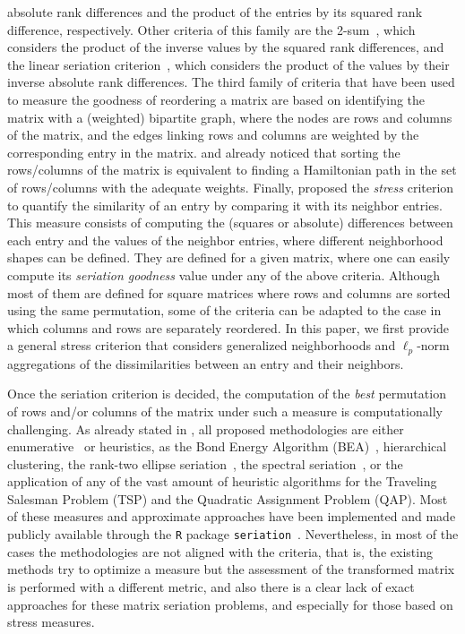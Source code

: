 \documentclass[a4paper,11pt, reqno]{amsart}
\begin{document}
absolute rank differences and the product of the entries by its squared rank difference, respectively. Other criteria of this family are the 2-sum~\citep{barnard1993spectral}, which considers the product of the inverse values by the squared rank differences, and the linear seriation criterion~\cite{hubert1976quadratic}, which considers the product of the values by their inverse absolute rank differences. The third family of criteria that have been used to measure the goodness of reordering a matrix are based on identifying the matrix with a (weighted) bipartite graph, where the nodes are rows and columns of the matrix, and the edges linking rows and columns are weighted by the corresponding entry in the matrix. \cite{hubert1976quadratic} and \cite{caraux2005permutmatrix} already noticed that sorting the rows/columns of the matrix is equivalent to finding a Hamiltonian path in the set of rows/columns with the adequate weights. Finally, \cite{niermann2005optimizing} proposed the \emph{stress} criterion to quantify the similarity of an entry by comparing it with its neighbor entries. This measure consists of computing the (squares or absolute) differences between each entry and the values of the neighbor entries, where different neighborhood shapes can be defined. They are defined for a given matrix, where one can easily compute its \emph{seriation goodness} value under any of the above criteria. Although most of them are defined for square matrices where rows and columns are sorted using the same permutation, some of the criteria can be adapted to the case in which columns and rows are separately reordered. In this paper, we first provide a general stress criterion that considers generalized neighborhoods and $\ell_p$-norm aggregations of the dissimilarities between an entry and their neighbors.

Once the seriation criterion is decided, the computation of the \emph{best} permutation of rows and/or columns of the matrix under such a measure is computationally challenging. As already stated in \cite{hahsler2008getting,hahsler2017experimental}, all proposed methodologies are either enumerative~\citep{hubert2001combinatorial,brusco2002integer} or heuristics, as the Bond Energy Algorithm (BEA)~\cite{mccormick1972problem}, hierarchical clustering, the rank-two ellipse seriation~\citep{chen2002generalized}, the spectral seriation~\citep{barnard1993spectral}, or the application of any of the vast amount of heuristic algorithms for the Traveling Salesman Problem (TSP) and the Quadratic Assignment Problem (QAP). Most of these measures and approximate approaches have been implemented and made publicly available through the \texttt{R} package \texttt{seriation}~\cite{hahsler2008getting}. Nevertheless, in most of the cases the methodologies are not aligned with the criteria, that is, the existing methods try to optimize a measure but the assessment of the transformed matrix is performed with a different metric, and also there is a clear lack of exact approaches for these matrix seriation problems, and especially for those based on stress measures. 
\end{document}
